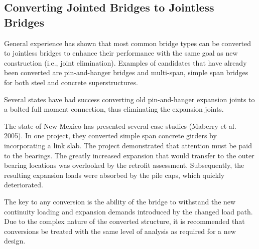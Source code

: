 \subsection{Converting Jointed Bridges to Jointless Bridges}
General experience has shown that most common bridge types can be converted to jointless bridges to enhance their performance with the same goal as new construction (i.e., joint elimination). Examples of candidates that have already been converted are pin-and-hanger bridges and multi-span, simple span bridges for both steel and concrete superstructures.

Several states have had success converting old pin-and-hanger expansion joints to a bolted full moment connection, thus eliminating the expansion joints.

The state of New Mexico has presented several case studies (Maberry et al. 2005). In one project, they converted simple span concrete girders by incorporating a link slab. The project demonstrated that attention must be paid to the bearings. The greatly increased expansion that would transfer to the outer bearing locations was overlooked by the retrofit assessment. Subsequently, the resulting expansion loads were absorbed by the pile caps, which quickly deteriorated.

The key to any conversion is the ability of the bridge to withstand the new continuity loading and expansion demands introduced by the changed load path. Due to the complex nature of the converted structure, it is recommended that conversions be treated with the same level of analysis as required for a new design.